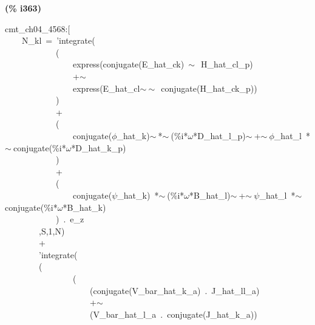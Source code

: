 \documentclass[fleqn]{article}
\begin{document}
\noindent
\begin{minipage}[t]{4.000000em}\color{red}\bfseries
(\% i363)	
\end{minipage}
\begin{minipage}[t]{\textwidth}\color{blue}
cmt\_ch04\_4568:[\\
\ \ \ \ N\_kl\ =\ 'integrate(\ \\
\ \ \ \ \ \ \ \ \ \ \ \ (\\
\ \ \ \ \ \ \ \ \ \ \ \ \ \ \ \ express(conjugate(E\_hat\_ck)\ \ensuremath{\sim\ }\ H\_hat\_cl\_p)\ \\
\ \ \ \ \ \ \ \ \ \ \ \ \ \ \ \ +\ensuremath{\sim\ }\\
\ \ \ \ \ \ \ \ \ \ \ \ \ \ \ \ express(E\_hat\_cl\ensuremath{\sim\ }\ensuremath{\sim\ }\ conjugate(H\_hat\_ck\_p))\\
\ \ \ \ \ \ \ \ \ \ \ \ )\\
\ \ \ \ \ \ \ \ \ \ \ \ +\\
\ \ \ \ \ \ \ \ \ \ \ \ (\\
\ \ \ \ \ \ \ \ \ \ \ \ \ \ \ \ conjugate(\ensuremath{\phi}\_hat\_k)\ensuremath{\sim\ }*\ensuremath{\sim\ }(\%i*\ensuremath{\omega}*D\_hat\_l\_p)\ensuremath{\sim\ }+\ensuremath{\sim\ }\ensuremath{\phi}\_hat\_l\ *\ensuremath{\sim\ }conjugate(\%i*\ensuremath{\omega}*D\_hat\_k\_p)\\
\ \ \ \ \ \ \ \ \ \ \ \ )\\
\ \ \ \ \ \ \ \ \ \ \ \ +\\
\ \ \ \ \ \ \ \ \ \ \ \ (\\
\ \ \ \ \ \ \ \ \ \ \ \ \ \ \ \ conjugate(\ensuremath{\psi}\_hat\_k)\ *\ensuremath{\sim\ }(\%i*\ensuremath{\omega}*B\_hat\_l)\ensuremath{\sim\ }+\ensuremath{\sim\ }\ensuremath{\psi}\_hat\_l\ *\ensuremath{\sim\ }conjugate(\%i*\ensuremath{\omega}*B\_hat\_k)\\
\ \ \ \ \ \ \ \ \ \ \ \ )\ .\ e\_z\\
\ \ \ \ \ \ \ \ ,S,1,N)\\
\ \ \ \ \ \ \ \ +\\
\ \ \ \ \ \ \ \ 'integrate(\\
\ \ \ \ \ \ \ \ (\\
\ \ \ \ \ \ \ \ \ \ \ \ \ \ \ \ (\\
\ \ \ \ \ \ \ \ \ \ \ \ \ \ \ \ \ \ \ \ (conjugate(V\_bar\_hat\_k\_a)\ .\ J\_hat\_ll\_a)\\
\ \ \ \ \ \ \ \ \ \ \ \ \ \ \ \ \ \ \ \ +\ensuremath{\sim\ }\\
\ \ \ \ \ \ \ \ \ \ \ \ \ \ \ \ \ \ \ \ (V\_bar\_hat\_l\_a\ .\ conjugate(J\_hat\_k\_a))\\

\end{minipage}
\end{document}
